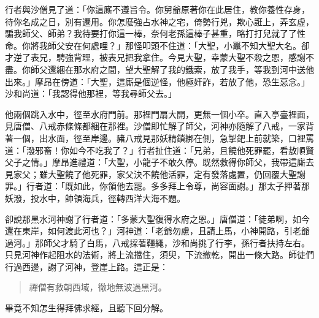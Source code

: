 行者與沙僧見了道：「你這廝不遵旨令。你舅爺原著你在此居住，教你養性存身，待你名成之日，別有遷用。你怎麼強占水神之宅，倚勢行兇，欺心誑上，弄玄虛，騙我師父、師弟？我待要打你這一棒，奈何老孫這棒子甚重，略打打兒就了了性命。你將我師父安在何處哩？」那怪叩頭不住道：「大聖，小鼉不知大聖大名。卻才逆了表兄，騁強背理，被表兄把我拿住。今見大聖，幸蒙大聖不殺之恩，感謝不盡。你師父還綑在那水府之間，望大聖解了我的鐵索，放了我手，等我到河中送他出來。」摩昂在傍道：「大聖，這廝是個逆怪，他極奸詐，若放了他，恐生惡念。」沙和尚道：「我認得他那裡，等我尋師父去。」

他兩個跳入水中，徑至水府門前。那裡門扇大開，更無一個小卒。直入亭臺裡面，見唐僧、八戒赤條條都綑在那裡。沙僧即忙解了師父，河神亦隨解了八戒，一家背著一個，出水面，徑至岸邊。豬八戒見那妖精鎖綁在側，急掣鈀上前就築，口裡罵道：「潑邪畜！你如今不吃我了？」行者扯住道：「兄弟，且饒他死罪罷，看敖順賢父子之情。」摩昂進禮道：「大聖，小龍子不敢久停。既然救得你師父，我帶這廝去見家父；雖大聖饒了他死罪，家父決不饒他活罪，定有發落處置，仍回覆大聖謝罪。」行者道：「既如此，你領他去罷。多多拜上令尊，尚容面謝。」那太子押著那妖潑，投水中，帥領海兵，徑轉西洋大海不題。

卻說那黑水河神謝了行者道：「多蒙大聖復得水府之恩。」唐僧道：「徒弟啊，如今還在東岸，如何渡此河也？」河神道：「老爺勿慮，且請上馬，小神開路，引老爺過河。」那師父才騎了白馬，八戒採著韁繩，沙和尚挑了行李，孫行者扶持左右。只見河神作起阻水的法術，將上流擋住，須臾，下流撤乾，開出一條大路。師徒們行過西邊，謝了河神，登崖上路。這正是：
\begin{quote}
禪僧有救朝西域，徹地無波過黑河。
\end{quote}

畢竟不知怎生得拜佛求經，且聽下回分解。
